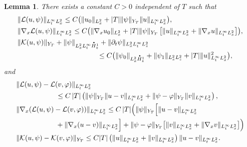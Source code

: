 \documentclass[JEP,XML,SOM,NoEqCountersInSection,NoFloatCountersInSection,Unicode,published]{cedram}
\newtheorem{lemma}{Lemma}[section]
\theoremstyle{definition}
\newcommand*{\overbigdot}[1]{%
\accentset{\mbox{\large\bfseries .}}{#1}}
\let\ds\displaystyle
\begin{document}
\begin{lemma}\label{lemma_TC1}
There exists a constant $C>0$ independent of $T$ such that
\begin{subequations}
\begin{align}
\label{estimate_strichartz_1} &\ds\|\mathcal{L}(u,\psi)\|_{L_{t}^{\infty}L_{x}^{2}} \leq  C\bigl(\|u_{0}\|_{L_{x}^{2}}+|T|\|\psi\|_{Y_{T}}\|u\|_{L_{t}^{\infty}L_{x}^{2}}\bigr),\\
\label{estimate_strichartz_2} &\ds\|\nabla_{x}\mathcal{L}(u,\psi)\|_{L_{t}^{\infty}L_{x}^{2}} \leq  C\bigl(\|\nabla_{x}u_{0}\|_{L_{x}^{2}}+|T|\|\psi\|_{Y_{T}}\left[\|u\|_{L_{t}^{\infty}L_{x}^{2}}+\|\nabla_{x}u\|_{L_{t}^{\infty}L_{x}^{2}}\right]\bigr),\\
\label{estimate_strichartz_3}&
\|\mathcal{K}(u,\psi)\|_{Y_{T}}+\|\psi\|_{L_{x}^{2}L_{t}^{\infty}\overbigdot{H}_{z}^{1}}+\|\partial_{t}\psi\|_{L_{x}^{2}L_{t}^{\infty}L_{z}^{2}}\\
&\hspace*{4cm}\leq C\bigl(\|\psi_{0}\|_{L_{x}^{2}\overbigdot{H}_{z}^{1}}+\|\psi_{1}\|_{L_{x}^{2}L_{z}^{2}}+|T|\|u\|_{L_{t}^{\infty}L_{x}^{2}}^{2}\bigr),\notag
\end{align}
\end{subequations}
and
\begin{subequations}
\begin{align}
\label{estimate_strichartz_4} &\|\mathcal{L}(u,\psi)-\mathcal{L}(v,\varphi)\|_{L_{t}^{\infty}L_{x}^{2}}\\
&\hspace*{2cm}\leq  C\,|T|\left(\|\psi\|_{Y_{T}}\|u-v\|_{L_{t}^{\infty}L_{x}^{2}}+\|\psi-\varphi\|_{Y_{T}}\|v\|_{L_{t}^{\infty}L_{x}^{2}}\right),\notag\\
\label{estimate_strichartz_5}&
\|\nabla_{x}(\mathcal{L}(u,\psi)-\mathcal{L}(v,\varphi))\|_{L_{t}^{\infty}L_{x}^{2}} \leq  C\,|T|\Bigl(\|\psi\|_{Y_{T}}\Bigl[\|u-v\|_{L_{t}^{\infty}L_{x}^{2}}\\
&\hspace*{2cm}+\|\nabla_{x}(u-v)\|_{L_{t}^{\infty}L_{x}^{2}} \Bigr]+\|\psi-\varphi\|_{Y_{T}}\bigl[\|v\|_{L_{t}^{\infty}L_{x}^{2}}+\|\nabla_{x}v\|_{L_{t}^{\infty}L_{x}^{2}}\bigr]\Bigr)\notag
\\
\label{estimate_strichartz_6}
&\|\mathcal{K}(u,\psi)-\mathcal{K}(v,\varphi)\|_{Y_{T}} \leq  C|T|\left(\|u\|_{L_{t}^{\infty}L_{x}^{2}}+\|v\|_{L_{t}^{\infty}L_{x}^{2}}\right)\|u-v\|_{L_{t}^{\infty}L_{x}^{2}}.
\end{align}
\end{subequations}
\end{lemma}
\end{document}
